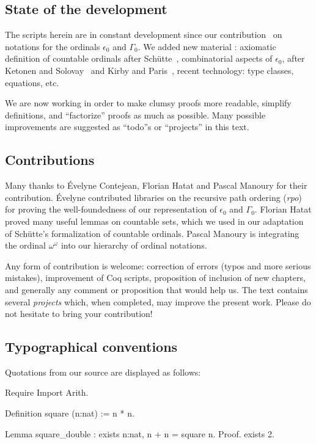 \documentclass[a4paper]{book}
\begin{document}
\subsection{State of the development}
The \coq{} scripts herein are in constant development since our contribution~\cite{CantorContrib} on  notations for the ordinals $\epsilon_0$ and $\Gamma_0$.
We added new material : axiomatic definition of countable ordinals after Schütte~\cite{schutte}, combinatorial aspects of $\epsilon_0$, after Ketonen and Solovay~\cite{KS81} and Kirby and Paris~\cite{KP82}, recent \coq{} technology: type classes, equations, etc.

We are now working in order to make clumsy proofs more readable, simplify definitions, and ``factorize'' proofs as much as possible. 
Many possible improvements are suggested as ``todo''s or ``projects'' in this text.

\subsection{Contributions}
Many thanks to \'Evelyne Contejean,  Florian Hatat and Pascal Manoury  for their contribution. \'Evelyne contributed libraries on the recursive path ordering (\emph{rpo}) for proving the well-foundedness of our representation of $\epsilon_0$ and $\Gamma_0$.
Florian Hatat proved many useful lemmas on countable sets, which we used in our adaptation of Schütte's formalization of countable ordinals. Pascal Manoury is integrating the ordinal $\omega^\omega$ into our hierarchy of ordinal notations.



\label{sec:orgheadline2}

Any form of contribution  is welcome: correction of errors (typos and more serious mistakes), improvement of
Coq scripts, proposition of inclusion of new chapters, and generally any
comment or proposition that would help us. The text contains several \emph{projects} which, when completed, may improve the present work.
Please do not hesitate to bring your contribution!



\subsection{Typographical conventions}

Quotations from our  \coq{} source are displayed as follows:


  \begin{Coqsrc}
 Require Import Arith.

 Definition square (n:nat) := n * n.

 Lemma square_double : exists n:nat, n + n = square n.
 Proof.
    exists 2. 
  \end{Coqsrc}
\end{document}
